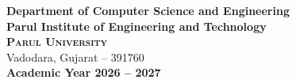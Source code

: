 \begin{center}
\vspace{0.3cm}
{\large \textbf{Department of Computer Science and Engineering}}\\
{\large \textbf{Parul Institute of Engineering and Technology}}\\
{\Large \textbf{\textsc{Parul University}}}\\
{\normalsize Vadodara, Gujarat -- 391760}\\
\vspace{0.2cm}
{\large \textbf{Academic Year 2026 -- 2027}}
\end{center}
\newpage
\cleardoublepage
